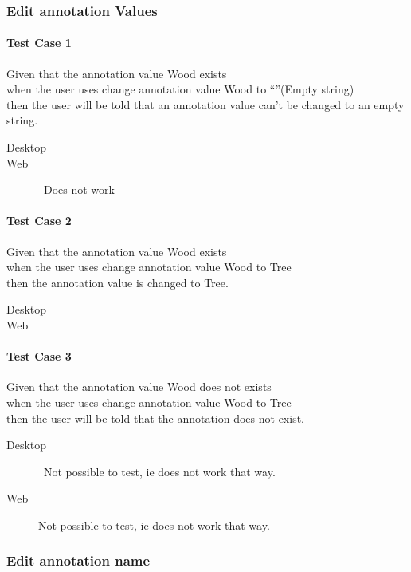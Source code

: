 \subsubsection{Edit annotation Values}
\paragraph*{Test Case 1}
Given that the annotation value Wood exists \\ when the user uses change annotation value Wood to “”(Empty string) \\ then the user will be told that an annotation value can’t be changed to an empty string.
\begin{description}
 \item[Desktop] \cmark
 \item[Web] \xmark\ Does not work
\end{description}
\paragraph*{Test Case 2}
Given that the annotation value Wood exists \\ when the user uses change annotation value Wood to Tree \\ then the annotation value is changed to Tree.
\begin{description}
 \item[Desktop] \cmark
 \item[Web] \cmark
\end{description}
\paragraph*{Test Case 3}
Given that the annotation value Wood does not exists \\ when the user uses change annotation value Wood to Tree \\ then the user will be told that the annotation does not exist.
\begin{description}
 \item[Desktop] \xmark\ Not possible to test, ie does not work that way.
 \item[Web] \xmark Not possible to test, ie does not work that way.
\end{description}


\subsubsection{Edit annotation name}
